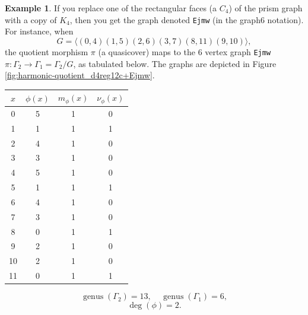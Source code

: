 \documentclass[12pt,letterpaper]{article}
\theoremstyle{definition}
\newtheorem{example}[theorem]{Example}
\DeclareMathOperator{\genus}{genus}
\begin{document}
\begin{example}
{If you replace one of the rectangular faces (a $C_4$)
of the prism graph with a copy of $K_4$, then you get the
graph denoted {\tt Ejmw} (in the graph6 notation).
For instance, when
\[
G = \langle (0,4)(1,5)(2,6)(3,7)(8,11)(9,10) \rangle ,
\]
the quotient morphism $\pi$ (a quasicover) maps to the $6$ vertex graph {\tt Ejmw}
$\pi: \Gamma_2\to \Gamma_1=\Gamma_2/G $, as tabulated below.
The graphs are depicted in
Figure \ref{fig:harmonic-quotient_d4reg12c+Ejmw}. 

\begin{center}
\begin{tabular}{c|c|c|c}  
  $x$ & $\phi(x)$ & $m_\phi(x)$ & $\nu_\phi(x)$ \\ \hline
  0   &    5   &        1         &  0   \\ 
  1   &    1   &        1         &  1  \\ 
  2   &    4   &        1         &  0  \\ 
  3   &    3   &        1         &  0  \\ 
  4   &    5   &        1         &  0   \\
  5   &    1   &        1         &  1   \\
  6   &    4   &        1         &  0   \\
  7   &    3   &        1         &  0   \\
  8   &    0   &        1         &  1   \\
  9   &    2   &        1         &  0   \\
  10   &   2   &        1         &  0  \\   
  11   &   0   &        1         &  1  \\
\end{tabular}
\end{center}

\[
  \genus(\Gamma_2) =13,\ \ \ \ \
  \genus(\Gamma_1) =6,
\]
\[
\deg(\phi) =2.
\]

}
\end{example}
\end{document}

